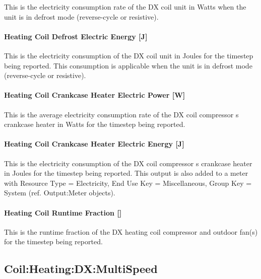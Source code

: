 This is the electricity consumption rate of the DX coil unit in Watts when the unit is in defrost mode (reverse-cycle or resistive).

\paragraph{Heating Coil Defrost Electric Energy {[}J{]}}\label{heating-coil-defrost-electric-energy-j}

This is the electricity consumption of the DX coil unit in Joules for the timestep being reported. This consumption is applicable when the unit is in defrost mode (reverse-cycle or resistive).

\paragraph{Heating Coil Crankcase Heater Electric Power {[}W{]}}\label{heating-coil-crankcase-heater-electric-power-w}

This is the average electricity consumption rate of the DX coil compressor s crankcase heater in Watts for the timestep being reported.

\paragraph{Heating Coil Crankcase Heater Electric Energy {[}J{]}}\label{heating-coil-crankcase-heater-electric-energy-j}

This is the electricity consumption of the DX coil compressor s crankcase heater in Joules for the timestep being reported. This output is also added to a meter with Resource Type = Electricity, End Use Key = Miscellaneous, Group Key = System (ref. Output:Meter objects).

\paragraph{Heating Coil Runtime Fraction {[]}}\label{heating-coil-runtime-fraction-4}

This is the runtime fraction of the DX heating coil compressor and outdoor fan(s) for the timestep being reported.

\subsection{Coil:Heating:DX:MultiSpeed}\label{coilheatingdxmultispeed}

